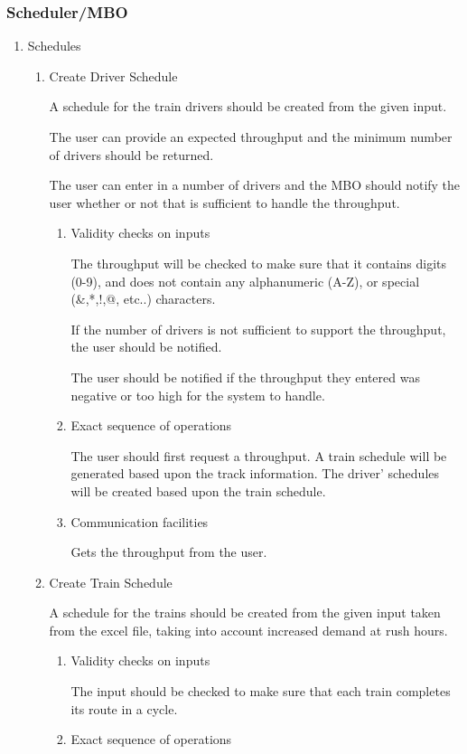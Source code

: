 \documentclass[11pt]{article}
\begin{document}
\subsubsection{Scheduler/MBO}
\label{sec-3-1-6}
\begin{enumerate}
\item Schedules
\label{sec-3-1-6-1}
\begin{enumerate}
\item Create Driver Schedule
\label{sec-3-1-6-1-1}

A schedule for the train drivers should be created from the given input.

The user can provide an expected throughput and the minimum number of drivers should be returned.

The user can enter in a number of drivers and the MBO should notify the user whether or not that is sufficient to handle the throughput.
\begin{enumerate}
\item Validity checks on inputs
\label{sec-3-1-6-1-1-1}

The throughput will be checked to make sure that it contains digits (0-9), and does not contain any alphanumeric (A-Z), or special (\&,*,!,@, etc..) characters.  

If the number of drivers is not sufficient to support the throughput, the user should be notified.

The user should be notified if the throughput they entered was negative or too high for the system to handle.
\item Exact sequence of operations
\label{sec-3-1-6-1-1-2}

The user should first request a throughput. A train schedule will be generated based upon the track information. The driver' schedules will be created based upon the train schedule.
\item Communication facilities
\label{sec-3-1-6-1-1-3}

Gets the throughput from the user.
\end{enumerate}
\item Create Train Schedule
\label{sec-3-1-6-1-2}

A schedule for the trains should be created from the given input taken from the excel file, taking into account increased demand at rush hours.
\begin{enumerate}
\item Validity checks on inputs
\label{sec-3-1-6-1-2-1}

The input should be checked to make sure that each train completes its route in a cycle.
\item Exact sequence of operations
\label{sec-3-1-6-1-2-2}


\end{enumerate}
\end{enumerate}
\end{enumerate}
\end{document}
